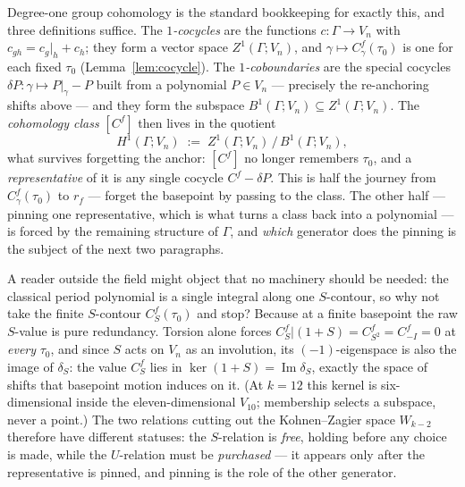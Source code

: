 \documentclass[11pt]{article}
\numberwithin{equation}{section}  %
\DeclareMathOperator{\im}{Im}
\begin{document}
Degree-one group cohomology is the standard bookkeeping for exactly this,
and three definitions suffice.  The \emph{$1$-cocycles} are the functions
$c\colon \Gamma \to V_n$ with $c_{gh} = c_g|_h + c_h$; they form a vector
space $Z^1(\Gamma; V_n)$, and $\gamma \mapsto C^f_\gamma(\tau_0)$ is one for
each fixed $\tau_0$ (Lemma~\ref{lem:cocycle}).  The \emph{$1$-coboundaries}
are the special cocycles $\delta P\colon \gamma \mapsto P|_\gamma - P$ built
from a polynomial $P \in V_n$ --- precisely the re-anchoring shifts above
--- and they form the subspace $B^1(\Gamma; V_n) \subseteq Z^1(\Gamma; V_n)$.
The \emph{cohomology class} $[C^f]$ then lives in the quotient
\begin{equation}\label{eq:H1-def}
  H^1(\Gamma; V_n) \;:=\; Z^1(\Gamma; V_n)\,\big/\,B^1(\Gamma; V_n),
\end{equation}
what survives forgetting the anchor: $[C^f]$ no longer remembers $\tau_0$,
and a \emph{representative} of it is any single cocycle $C^f - \delta P$.
This is half the journey from $C^f_\gamma(\tau_0)$ to $r_f$ --- forget the
basepoint by passing to the class.  The other half --- pinning one
representative, which is what turns a class back into a polynomial --- is
forced by the remaining structure of $\Gamma$, and \emph{which} generator
does the pinning is the subject of the next two paragraphs.

A reader outside the field might object that no machinery should be
needed: the classical period polynomial is a single integral along one
$S$-contour, so why not take the finite $S$-contour $C^f_S(\tau_0)$ and
stop?  Because at a finite basepoint the raw $S$-value is pure
redundancy.  Torsion alone forces
$C^f_S\big|(1+S) = C^f_{S^2} = C^f_{-I} = 0$ at \emph{every} $\tau_0$,
and since $S$ acts on $V_n$ as an involution, its $(-1)$-eigenspace is
also the image of $\delta_S$: the value $C^f_S$ lies in
$\ker(1+S) = \im \delta_S$, exactly the space of shifts that basepoint
motion induces on it.  (At $k = 12$ this kernel is six-dimensional
inside the eleven-dimensional $V_{10}$; membership selects a subspace,
never a point.)  The two relations cutting out the Kohnen--Zagier space
$W_{k-2}$ \cite{KZ1984} therefore have different statuses: the
$S$-relation is \emph{free}, holding before any choice is made, while
the $U$-relation must be \emph{purchased} --- it appears only after the
representative is pinned, and pinning is the role of the other
generator.
\end{document}
